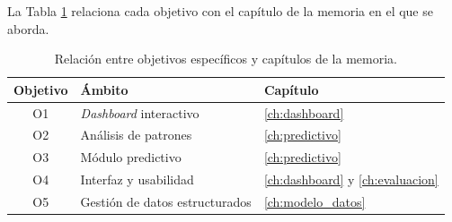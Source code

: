 La Tabla \ref{tab:objetivos_capitulos} relaciona cada objetivo con el capítulo de la memoria en el que se aborda.

\begin{table}[H]
\centering
\caption{Relación entre objetivos específicos y capítulos de la memoria.}
\label{tab:objetivos_capitulos}
\begin{tabular}{@{}cll@{}}
\toprule
\textbf{Objetivo} & \textbf{Ámbito} & \textbf{Capítulo} \\
\midrule
O1 & \textit{Dashboard} interactivo & \ref{ch:dashboard} \\
O2 & Análisis de patrones & \ref{ch:predictivo} \\
O3 & Módulo predictivo & \ref{ch:predictivo} \\
O4 & Interfaz y usabilidad & \ref{ch:dashboard} y \ref{ch:evaluacion} \\
O5 & Gestión de datos estructurados & \ref{ch:modelo_datos} \\
\bottomrule
\end{tabular}
\end{table}
